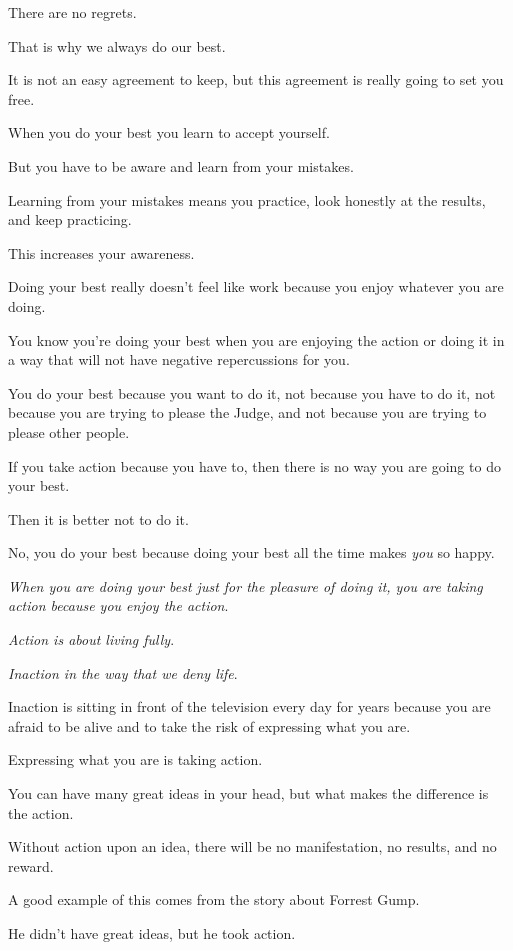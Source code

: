 \documentclass{article}
\numberwithin{equation}{section}
\begin{document}
There are no regrets.

That is why we always do our best.

It is not an easy agreement to keep, but this agreement is really going to set you free.

%
When you do your best you learn to accept yourself.

But you have to be aware and learn from your mistakes.

Learning from your mistakes means you practice, look honestly at the results, and keep practicing.

This increases your awareness.

%
Doing your best really doesn't feel like work because you enjoy whatever you are doing.

You know you're doing your best when you are enjoying the action or doing it in a way that will not have negative repercussions for you.

You do your best because you want to do it, not because you have to do it, not because you are trying to please the Judge, and not because you are trying to please other people.

%
If you take action because you have to, then there is no way you are going to do your best.

Then it is better not to do it.

No, you do your best because doing your best all the time makes \textit{you} so happy.

\textit{When you are doing your best just for the pleasure of doing it, you are taking action because you enjoy the action}.

%
\textit{Action is about living fully}.

\textit{Inaction in the way that we deny life}.

Inaction is sitting in front of the television every day for years because you are afraid to be alive and to take the risk of expressing what you are.

Expressing what you are is taking action.

You can have many great ideas in your head, but what makes the difference is the action.

Without action upon an idea, there will be no manifestation, no results, and no reward.

%
A good example of this comes from the story about Forrest Gump.

He didn't have great ideas, but he took action.
\end{document}
